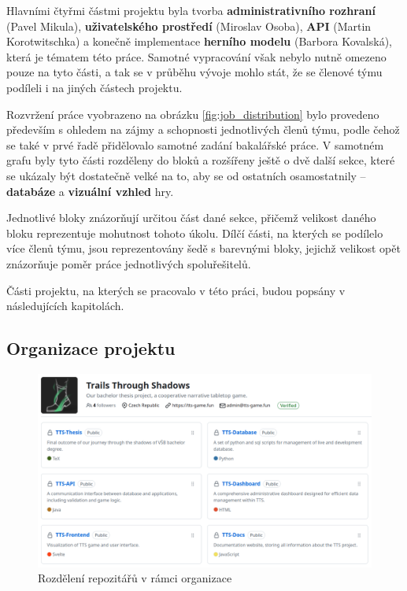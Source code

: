 Hlavními čtyřmi částmi projektu byla tvorba \textbf{administrativního rozhraní} (Pavel Mikula), \textbf{uživatelského prostředí} (Miroslav Osoba), \textbf{API} (Martin Korotwitschka) a konečně implementace \textbf{herního modelu} (Barbora Kovalská), která je tématem této práce. Samotné vypracování však nebylo nutně omezeno pouze na tyto části, a tak se v průběhu vývoje mohlo stát, že se členové týmu podíleli i na jiných částech projektu.

Rozvržení práce vyobrazeno na obrázku \ref{fig:job_distribution} bylo provedeno především s ohledem na zájmy a schopnosti jednotlivých členů týmu, podle čehož se také v prvé řadě přidělovalo samotné zadání bakalářské práce. V samotném grafu byly tyto části rozděleny do bloků a rozšířeny ještě o dvě další sekce, které se ukázaly být dostatečně velké na to, aby se od ostatních osamostatnily -- \textbf{databáze} a \textbf{vizuální vzhled} hry. 

Jednotlivé bloky znázorňují určitou část dané sekce, přičemž velikost daného bloku reprezentuje mohutnost tohoto úkolu. Dílčí části, na kterých se podílelo více členů týmu, jsou reprezentovány šedě s barevnými bloky, jejichž velikost opět znázorňuje poměr práce jednotlivých spoluřešitelů.

Části projektu, na kterých se pracovalo v této práci, budou popsány v následujících kapitolách.

\subsection{Organizace projektu}
\label{subsec:versioning}

\begin{figure}[h]
    \centering
    \includegraphics[width=\textwidth]{../../shared/figures/gitOrg.png}
    \caption{Rozdělení repozitářů v rámci organizace}
    \label{fig:git_organization}
\end{figure}

